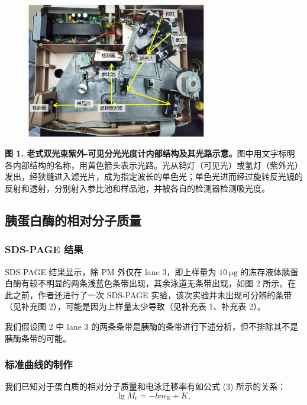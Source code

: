 \documentclass[11pt,UTF8]{ctexart}
\newenvironment{unicaption}{\noindent\small}{\normalsize}
\begin{document}
    \begin{figure}[H] %
        \centering %
        \includegraphics[width=0.7\textwidth]{optical.pdf} %
    \end{figure}

    \begin{unicaption}
        \textbf{图 1. 老式双光束紫外-可见分光光度计内部结构及其光路示意。}图中用文字标明各内部结构的名称，用黄色箭头表示光路。光从钨灯（可见光）或氢灯（紫外光）发出，经狭缝进入滤光片，成为指定波长的单色光；单色光进而经过旋转反光镜的反射和透射，分别射入参比池和样品池，并被各自的检测器检测吸光度。
    \end{unicaption}

    \subsection{胰蛋白酶的相对分子质量}
        \subsubsection{SDS-PAGE 结果}
        SDS-PAGE 结果显示，除 PM 外仅在 lane 3，即上样量为 \(\mathrm{10\ \mu g}\) 的冻存液体胰蛋白酶有较不明显的两条浅蓝色条带出现，其余泳道无条带出现，如图 2 所示。在此之前，作者还进行了一次 SDS-PAGE 实验，该次实验并未出现可分辨的条带（见补充图 2），可能是因为上样量太少导致（见补充表 1、补充表 2）。

        我们假设图 2 中 lane 3 的两条条带是胰酶的条带进行下述分析，但不排除其不是胰酶条带的可能。

        \subsubsection{标准曲线的制作}
        我们已知对于蛋白质的相对分子质量和电泳迁移率有如公式 (3) 所示的关系：
        \begin{equation}
            \lg{M_\mathrm{r}} = -bm_\mathrm{R} + K,
        \end{equation}
\end{document}
